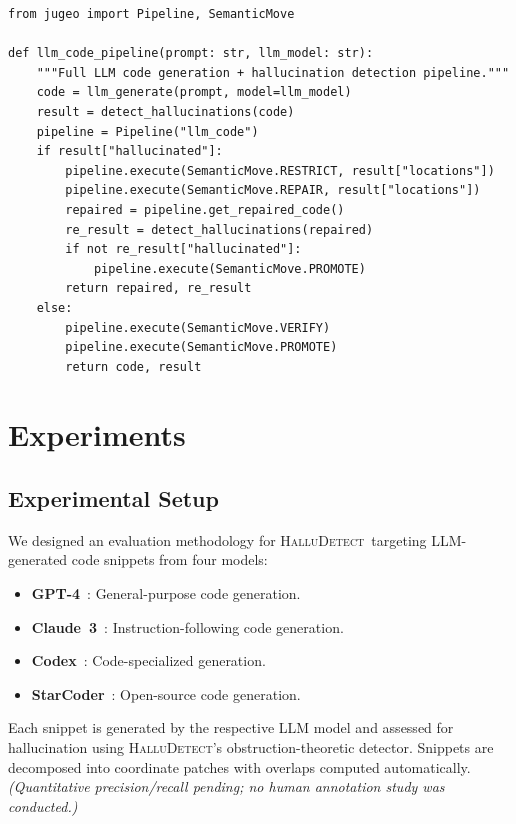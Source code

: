 \documentclass[11pt]{article}
\newcommand{\HalluDetect}{\textsc{HalluDetect}}
\begin{document}
\begin{lstlisting}
from jugeo import Pipeline, SemanticMove

def llm_code_pipeline(prompt: str, llm_model: str):
    """Full LLM code generation + hallucination detection pipeline."""
    code = llm_generate(prompt, model=llm_model)
    result = detect_hallucinations(code)
    pipeline = Pipeline("llm_code")
    if result["hallucinated"]:
        pipeline.execute(SemanticMove.RESTRICT, result["locations"])
        pipeline.execute(SemanticMove.REPAIR, result["locations"])
        repaired = pipeline.get_repaired_code()
        re_result = detect_hallucinations(repaired)
        if not re_result["hallucinated"]:
            pipeline.execute(SemanticMove.PROMOTE)
        return repaired, re_result
    else:
        pipeline.execute(SemanticMove.VERIFY)
        pipeline.execute(SemanticMove.PROMOTE)
        return code, result
\end{lstlisting}


\section{Experiments}\label{sec:experiments}

\subsection{Experimental Setup}

We designed an evaluation methodology for \HalluDetect\ targeting
LLM-generated code snippets from four models:

\begin{itemize}[noitemsep]
  \item \textbf{GPT-4}~\cite{OpenAI2023}: General-purpose code generation.
  \item \textbf{Claude~3}~\cite{Anthropic2024}: Instruction-following code generation.
  \item \textbf{Codex}~\cite{Chen2021}: Code-specialized generation.
  \item \textbf{StarCoder}~\cite{Li2023starcoder}: Open-source code generation.
\end{itemize}

Each snippet is generated by the respective LLM model and
assessed for hallucination using \HalluDetect{}'s obstruction-theoretic
detector.  Snippets are decomposed into coordinate patches with
overlaps computed automatically.
\emph{(Quantitative precision/recall pending; no human annotation study was conducted.)}
\end{document}

